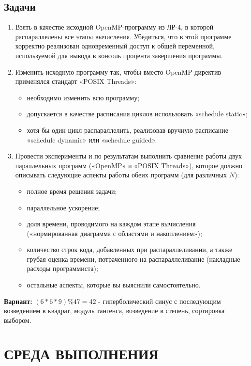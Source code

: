 \documentclass[14pt, a4paper, oneside, final]{extarticle}
\begin{document}
\subsection*{Задачи}
\begin{enumerate}
 \item Взять в качестве исходной OpenMP-программу из ЛР-4, в которой распараллелены все этапы вычисления. Убедиться, что в этой программе корректно реализован одновременный доступ к общей переменной, используемой для вывода в консоль процента завершения программы.

 \item Изменить исходную программу так, чтобы вместо OpenMP-директив применялся стандарт «POSIX Threads»:
  \begin{itemize}
  \item необходимо изменить всю программу;
   \item допускается в качестве расписания циклов использовать «schedule static»;
   \item хотя бы один цикл распараллелить, реализовав вручную расписание «schedule dynamic» или «schedule guided».
  \end{itemize}


 \item Провести эксперименты и по результатам выполнить сравнение работы двух параллельных программ («OpenMP» и «POSIX Threads»), которое должно описывать следующие аспекты работы обеих программ (для различных $N$):
 \begin{itemize}
  \item полное время решения задачи;
  \item параллельное ускорение;
  \item доля времени, проводимого на каждом этапе вычисления («нормированная диаграмма с областями и накоплением»);
  \item количество строк кода, добавленных при распараллеливании, а также грубая оценка времени, потраченного на распараллеливание (накладные расходы программиста);
  \item остальные аспекты, которые вы выяснили самостоятельно.
 \end{itemize}
\end{enumerate}

\textbf{Вариант:} $(6*6*9) \% 47 = 42$ - гиперболический синус с последующим возведением в квадрат, модуль тангенса, возведение в степень, сортировка выбором.

\clearpage
\section*{СРЕДА ВЫПОЛНЕНИЯ}
\end{document}
